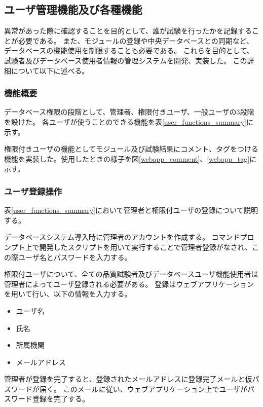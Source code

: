 \clearpage

\subsection{ユーザ管理機能及び各種機能}

異常があった際に確認することを目的として、誰が試験を行ったかを記録することが必要である。
また、モジュールの登録や中央データベースとの同期など、データベースの機能使用を制限することも必要である。
これらを目的として、試験者及びデータベース使用者情報の管理システムを開発、実装した。
この詳細について以下に述べる。

\subsubsection{機能概要}
データベース権限の段階として、管理者、権限付きユーザ、一般ユーザの3段階を設けた。
各ユーザが使うことのできる機能を表\ref{user_functions_summary}に示す。

権限付きユーザの機能としてモジュール及び試験結果にコメント、タグをつける機能を実装した。使用したときの様子を図\ref{webapp_comment}、\ref{webapp_tag}に示す。

\subsubsection{ユーザ登録操作}
表\ref{user_functions_summary}において管理者と権限付ユーザの登録について説明する。

データベースシステム導入時に管理者のアカウントを作成する。
コマンドプロンプト上で開発したスクリプトを用いて実行することで管理者登録がなされ、この際ユーザ名とパスワードを入力する。

権限付ユーザについて、全ての品質試験者及びデータベースユーザ機能使用者は管理者によってユーザ登録される必要がある。
登録はウェブアプリケーションを用いて行い、以下の情報を入力する。
\begin{itemize}
  \item ユーザ名 
  \item 氏名
  \item 所属機関
  \item メールアドレス 
\end{itemize}

管理者が登録を完了すると、登録されたメールアドレスに登録完了メールと仮パスワードが届く。
このメールに従い、ウェブアプリケーション上でユーザがパスワード登録を完了する。

